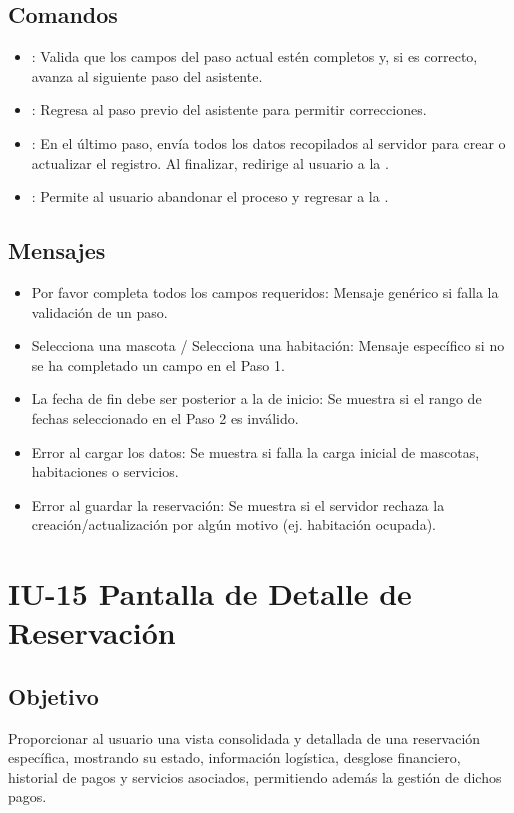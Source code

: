 \subsection{Comandos}
\begin{itemize}
    \item {}: Valida que los campos del paso actual estén completos y, si es correcto, avanza al siguiente paso del asistente.
    \item {}: Regresa al paso previo del asistente para permitir correcciones.
    \item {}: En el último paso, envía todos los datos recopilados al servidor para crear o actualizar el registro. Al finalizar, redirige al usuario a la .
    \item {}: Permite al usuario abandonar el proceso y regresar a la .
\end{itemize}

\subsection{Mensajes}
\begin{itemize}
    \item Por favor completa todos los campos requeridos: Mensaje genérico si falla la validación de un paso.
    \item Selecciona una mascota / Selecciona una habitación: Mensaje específico si no se ha completado un campo en el Paso 1.
    \item La fecha de fin debe ser posterior a la de inicio: Se muestra si el rango de fechas seleccionado en el Paso 2 es inválido.
    \item Error al cargar los datos: Se muestra si falla la carga inicial de mascotas, habitaciones o servicios.
    \item Error al guardar la reservación: Se muestra si el servidor rechaza la creación/actualización por algún motivo (ej. habitación ocupada).
\end{itemize}
\section{IU-15 Pantalla de Detalle de Reservación}

\subsection{Objetivo}
    Proporcionar al usuario una vista consolidada y detallada de una reservación específica, mostrando su estado, información logística, desglose financiero, historial de pagos y servicios asociados, permitiendo además la gestión de dichos pagos.

